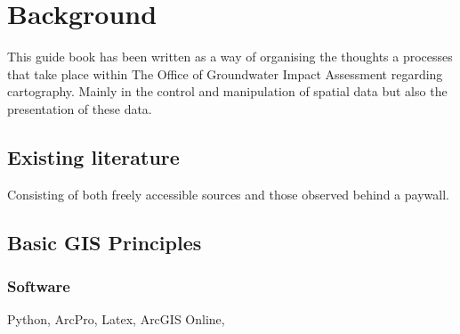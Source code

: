 \chapter{Background}
\label{chap:background}
This guide book has been written as a way of organising the thoughts a processes that take place within The Office of Groundwater Impact Assessment regarding cartography. Mainly in the control and manipulation of spatial data but also the presentation of these data.

\section{Existing literature}
Consisting of both freely accessible sources and those observed behind a paywall.

\section{Basic GIS Principles}
\subsection{Software}
Python, ArcPro, Latex, ArcGIS Online, 